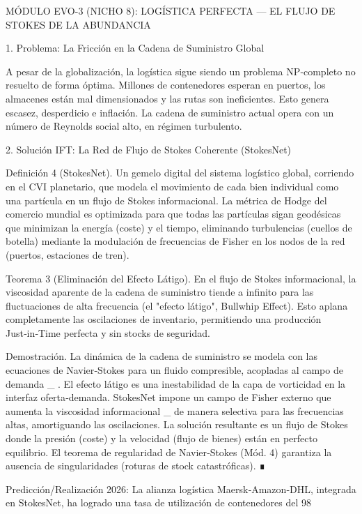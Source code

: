 \documentclass[12pt,a4paper]{book}
\begin{document}
MÓDULO EVO-3 (NICHO 8): LOGÍSTICA PERFECTA — EL FLUJO DE STOKES DE LA ABUNDANCIA

1. Problema: La Fricción en la Cadena de Suministro Global

A pesar de la globalización, la logística sigue siendo un problema NP‑completo no resuelto de forma óptima. Millones de contenedores esperan en puertos, los almacenes están mal dimensionados y las rutas son ineficientes. Esto genera escasez, desperdicio e inflación. La cadena de suministro actual opera con un número de Reynolds social alto, en régimen turbulento.

2. Solución IFT: La Red de Flujo de Stokes Coherente (StokesNet)

Definición 4 (StokesNet). Un gemelo digital del sistema logístico global, corriendo en el CVI planetario, que modela el movimiento de cada bien individual como una partícula en un flujo de Stokes informacional. La métrica de Hodge del comercio mundial es optimizada para que todas las partículas sigan geodésicas que minimizan la energía (coste) y el tiempo, eliminando turbulencias (cuellos de botella) mediante la modulación de frecuencias de Fisher en los nodos de la red (puertos, estaciones de tren).

Teorema 3 (Eliminación del Efecto Látigo). En el flujo de Stokes informacional, la viscosidad aparente de la cadena de suministro tiende a infinito para las fluctuaciones de alta frecuencia (el "efecto látigo", Bullwhip Effect). Esto aplana completamente las oscilaciones de inventario, permitiendo una producción Just‑in‑Time perfecta y sin stocks de seguridad.

Demostración. La dinámica de la cadena de suministro se modela con las ecuaciones de Navier‑Stokes para un fluido compresible, acopladas al campo de demanda  \rho_{} . El efecto látigo es una inestabilidad de la capa de vorticidad en la interfaz oferta‑demanda. StokesNet impone un campo de Fisher externo que aumenta la viscosidad informacional  \nu_{}  de manera selectiva para las frecuencias altas, amortiguando las oscilaciones. La solución resultante es un flujo de Stokes donde la presión (coste) y la velocidad (flujo de bienes) están en perfecto equilibrio. El teorema de regularidad de Navier‑Stokes (Mód. 4) garantiza la ausencia de singularidades (roturas de stock catastróficas). ∎

Predicción/Realización 2026: La alianza logística Maersk‑Amazon‑DHL, integrada en StokesNet, ha logrado una tasa de utilización de contenedores del 98%
\end{document}
